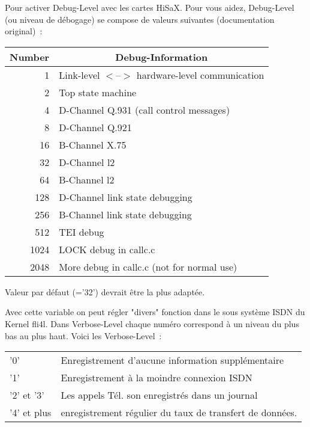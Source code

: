 \begin{description}
  Pour activer Debug-Level avec les cartes HiSaX. Pour vous aidez, Debug-Level
  (ou niveau de débogage) se compose de valeurs suivantes (documentation original)~:\\

  \begin{tabular}[h!]{r|l}
   \multicolumn{1}{c|}{\textbf{Number}} & \multicolumn{1}{c}{\textbf{Debug-Information}} \\
   \hline
      1 & Link-level $<$--$>$ hardware-level communication \\
      2 & Top state machine \\
      4 & D-Channel Q.931 (call control messages) \\
      8 & D-Channel Q.921 \\
     16 & B-Channel X.75 \\
     32 & D-Channel l2 \\
     64 & B-Channel l2 \\
    128 & D-Channel link state debugging \\
    256 & B-Channel link state debugging \\
    512 & TEI debug \\
   1024 & LOCK debug in callc.c \\
   2048 & More debug in callc.c (not for normal use) \\
  \end{tabular}\latex{\\}

  Valeur par défaut (='32') devrait être la plus adaptée.


  Avec cette variable on peut régler "divers" fonction dans le sous système ISDN
  du Kernel fli4l. Dans Verbose-Level chaque numéro correspond à un niveau du
  plus bas au plus haut. Voici les Verbose-Level~:

  \begin{tabular}[h!]{lp{10cm}}
    '0' & Enregistrement d'aucune information supplémentaire \\
    '1' & Enregistrement à la moindre connexion ISDN\\
    '2' et '3' & Les appels Tél. son enregistrés dans un journal\\
    '4' et plus & enregistrement régulier du taux de transfert de données. \\
  \end{tabular}


\end{description}
